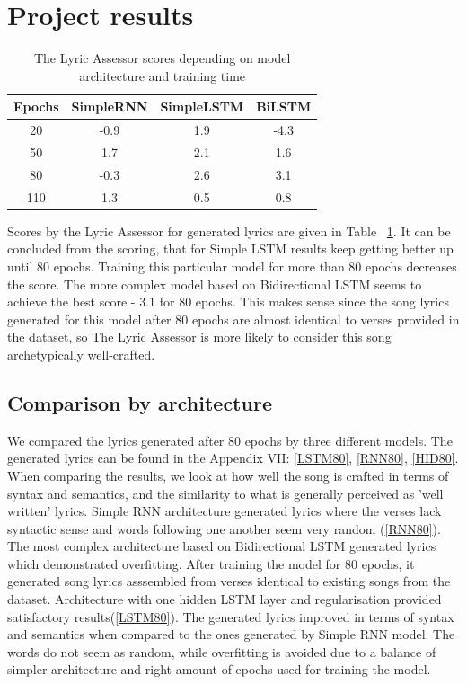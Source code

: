 \documentclass[conference]{IEEEtran}
\begin{document}
\section{Project results}

\begin{table}[ht]
\caption{The Lyric Assessor scores depending on model architecture and training time} %
\centering %
\begin{tabular}{c c c c} %
\hline\hline %
Epochs & SimpleRNN & SimpleLSTM & BiLSTM\\ [0.5ex] %
\hline %
20 & -0.9 & 1.9 & -4.3 \\ %
50 & 1.7 & 2.1 & 1.6 \\
80 & -0.3 & 2.6 & 3.1 \\
110 & 1.3 & 0.5 & 0.8 \\[1ex]
\hline %
\end{tabular}
\label{table:scores} %
\end{table}

Scores by the Lyric Assessor for generated lyrics  are given in Table ~\ref{table:scores}. It can be concluded from the scoring, 
that for Simple LSTM results keep getting better up until 80 epochs. Training this particular model for more than 80 epochs decreases the score.
The more complex model based on Bidirectional LSTM seems to achieve the best score - 3.1 for 80 epochs. This makes sense since the song lyrics 
generated for this model after 80 epochs are almost identical to verses provided in the dataset, so The Lyric Assessor is more likely to consider 
this song archetypically well-crafted.

\subsection{Comparison by architecture}
We compared the lyrics generated after 80 epochs by three different models. The generated lyrics can be found in the Appendix VII: \ref{LSTM80}, \ref{RNN80}, \ref{HID80}.
When comparing the results, we look at how well the song is crafted in terms of syntax and semantics, and the similarity to what is generally perceived as 'well written' lyrics. 
Simple RNN architecture generated lyrics where the verses lack syntactic sense and words following one another seem very random (\ref{RNN80}). 
The most complex architecture based on Bidirectional LSTM generated lyrics which demonstrated overfitting. After training the model for 80 epochs, it generated song lyrics asssembled from verses identical to existing songs from the dataset.
Architecture with one hidden LSTM layer and regularisation provided satisfactory results(\ref{LSTM80}). The generated lyrics improved in terms of syntax and semantics when compared to the ones generated by Simple RNN model. The words do not seem as random, while overfitting is avoided due to a balance of simpler architecture and right amount of epochs used for training the model.
\end{document}
